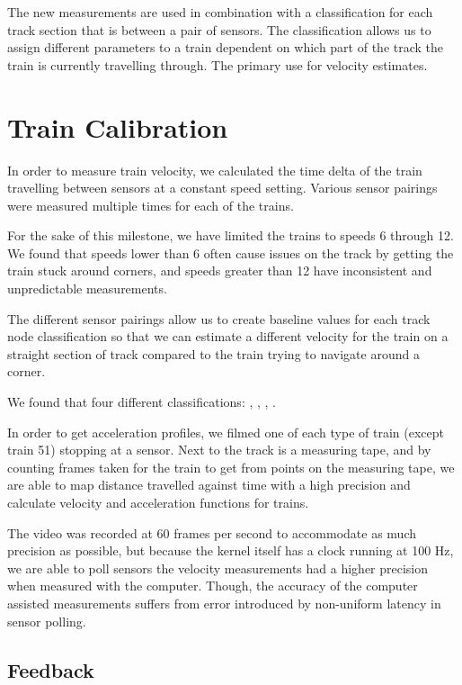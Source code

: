 \documentclass[pdftex,10pt,a4paper]{article}
\begin{document}
The new measurements are used in combination with a classification for each
track section that is between a pair of sensors. The classification
allows us to assign different parameters to a train dependent on which
part of the track the train is currently travelling through. The
primary use for velocity estimates.

\section*{Train Calibration}

In order to measure train velocity, we calculated the time delta of
the train travelling between sensors at a constant speed
setting. Various sensor pairings were measured multiple times for each
of the trains.

For the sake of this milestone, we have limited the trains to speeds 6
through 12. We found that speeds lower than 6 often cause issues on
the track by getting the train stuck around corners, and speeds
greater than 12 have inconsistent and unpredictable measurements.

The different sensor pairings allow us to create baseline values for
each track node classification so that we can estimate a different
velocity for the train on a straight section of track compared to the
train trying to navigate around a corner.

We found that four different classifications: ,
, , .

In order to get acceleration profiles, we filmed one of each type of
train (except train 51) stopping at a sensor. Next to the track is a
measuring tape, and by counting frames taken for the train to get from
points on the measuring tape, we are able to map distance travelled
against time with a high precision and calculate velocity and
acceleration functions for trains.

The video was recorded at 60 frames per second to accommodate as much
precision as possible, but because the kernel itself has a clock
running at 100 Hz, we are able to poll sensors the velocity
measurements had a higher precision when measured with the
computer. Though, the accuracy of the computer assisted measurements
suffers from error introduced by non-uniform latency in sensor polling.

\subsection*{Feedback}
\end{document}
